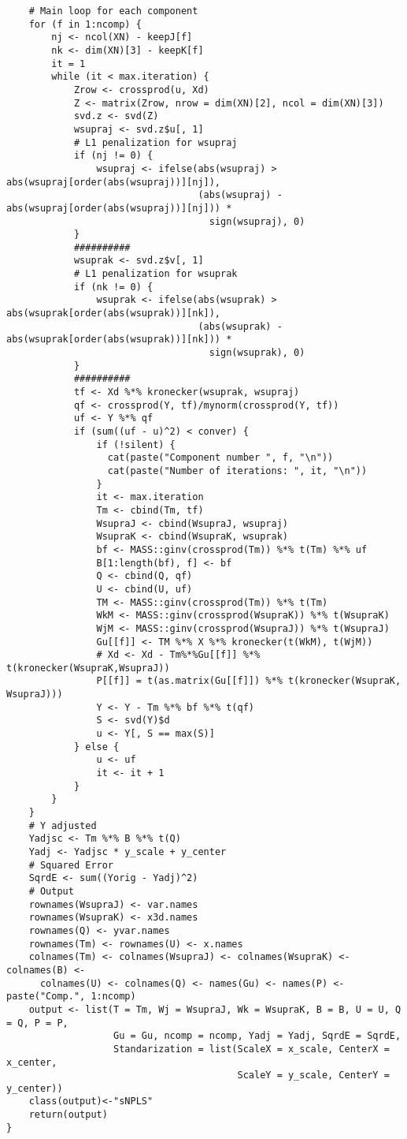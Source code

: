 \begin{scriptsize}
\begin{verbatim}
    # Main loop for each component
    for (f in 1:ncomp) {
        nj <- ncol(XN) - keepJ[f]
        nk <- dim(XN)[3] - keepK[f]
        it = 1
        while (it < max.iteration) {
            Zrow <- crossprod(u, Xd)
            Z <- matrix(Zrow, nrow = dim(XN)[2], ncol = dim(XN)[3])
            svd.z <- svd(Z)
            wsupraj <- svd.z$u[, 1]
            # L1 penalization for wsupraj
            if (nj != 0) {
                wsupraj <- ifelse(abs(wsupraj) > abs(wsupraj[order(abs(wsupraj))][nj]),
                                  (abs(wsupraj) - abs(wsupraj[order(abs(wsupraj))][nj])) *
                                    sign(wsupraj), 0)
            }
            ##########
            wsuprak <- svd.z$v[, 1]
            # L1 penalization for wsuprak
            if (nk != 0) {
                wsuprak <- ifelse(abs(wsuprak) > abs(wsuprak[order(abs(wsuprak))][nk]),
                                  (abs(wsuprak) - abs(wsuprak[order(abs(wsuprak))][nk])) *
                                    sign(wsuprak), 0)
            }
            ##########
            tf <- Xd %*% kronecker(wsuprak, wsupraj)
            qf <- crossprod(Y, tf)/mynorm(crossprod(Y, tf))
            uf <- Y %*% qf
            if (sum((uf - u)^2) < conver) {
                if (!silent) {
                  cat(paste("Component number ", f, "\n"))
                  cat(paste("Number of iterations: ", it, "\n"))
                }
                it <- max.iteration
                Tm <- cbind(Tm, tf)
                WsupraJ <- cbind(WsupraJ, wsupraj)
                WsupraK <- cbind(WsupraK, wsuprak)
                bf <- MASS::ginv(crossprod(Tm)) %*% t(Tm) %*% uf
                B[1:length(bf), f] <- bf
                Q <- cbind(Q, qf)
                U <- cbind(U, uf)
                TM <- MASS::ginv(crossprod(Tm)) %*% t(Tm)
                WkM <- MASS::ginv(crossprod(WsupraK)) %*% t(WsupraK)
                WjM <- MASS::ginv(crossprod(WsupraJ)) %*% t(WsupraJ)
                Gu[[f]] <- TM %*% X %*% kronecker(t(WkM), t(WjM))
                # Xd <- Xd - Tm%*%Gu[[f]] %*% t(kronecker(WsupraK,WsupraJ))
                P[[f]] = t(as.matrix(Gu[[f]]) %*% t(kronecker(WsupraK, WsupraJ)))
                Y <- Y - Tm %*% bf %*% t(qf)
                S <- svd(Y)$d
                u <- Y[, S == max(S)]
            } else {
                u <- uf
                it <- it + 1
            }
        }
    }
    # Y adjusted
    Yadjsc <- Tm %*% B %*% t(Q)
    Yadj <- Yadjsc * y_scale + y_center
    # Squared Error
    SqrdE <- sum((Yorig - Yadj)^2)
    # Output
    rownames(WsupraJ) <- var.names
    rownames(WsupraK) <- x3d.names
    rownames(Q) <- yvar.names
    rownames(Tm) <- rownames(U) <- x.names
    colnames(Tm) <- colnames(WsupraJ) <- colnames(WsupraK) <- colnames(B) <-
      colnames(U) <- colnames(Q) <- names(Gu) <- names(P) <- paste("Comp.", 1:ncomp)
    output <- list(T = Tm, Wj = WsupraJ, Wk = WsupraK, B = B, U = U, Q = Q, P = P,
                   Gu = Gu, ncomp = ncomp, Yadj = Yadj, SqrdE = SqrdE,
                   Standarization = list(ScaleX = x_scale, CenterX = x_center,
                                         ScaleY = y_scale, CenterY = y_center))
    class(output)<-"sNPLS"
    return(output)
}


\end{verbatim}
\end{scriptsize}
